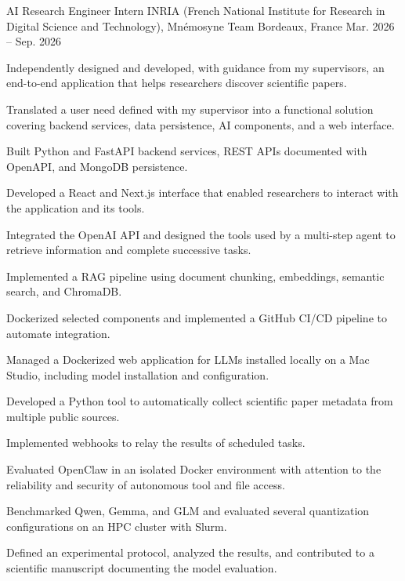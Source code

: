 
\begin{cventries}
  \cventry
    {AI Research Engineer Intern}
    {INRIA (French National Institute for Research in Digital Science and Technology), Mnémosyne Team}
    {Bordeaux, France}
    {Mar. 2026 -- Sep. 2026}
    {
      \begin{cvitems}
        \item {Independently designed and developed, with guidance from my supervisors, an end-to-end application that helps researchers discover scientific papers.}
        \item {Translated a user need defined with my supervisor into a functional solution covering backend services, data persistence, AI components, and a web interface.}
        \item {Built Python and FastAPI backend services, REST APIs documented with OpenAPI, and MongoDB persistence.}
        \item {Developed a React and Next.js interface that enabled researchers to interact with the application and its tools.}
        \item {Integrated the OpenAI API and designed the tools used by a multi-step agent to retrieve information and complete successive tasks.}
        \item {Implemented a RAG pipeline using document chunking, embeddings, semantic search, and ChromaDB.}
        \item {Dockerized selected components and implemented a GitHub CI/CD pipeline to automate integration.}
        \item {Managed a Dockerized web application for LLMs installed locally on a Mac Studio, including model installation and configuration.}
        \item {Developed a Python tool to automatically collect scientific paper metadata from multiple public sources.}
        \item {Implemented webhooks to relay the results of scheduled tasks.}
        \item {Evaluated OpenClaw in an isolated Docker environment with attention to the reliability and security of autonomous tool and file access.}
        \item {Benchmarked Qwen, Gemma, and GLM and evaluated several quantization configurations on an HPC cluster with Slurm.}
        \item {Defined an experimental protocol, analyzed the results, and contributed to a scientific manuscript documenting the model evaluation.}
      \end{cvitems}
    }


\end{cventries}
